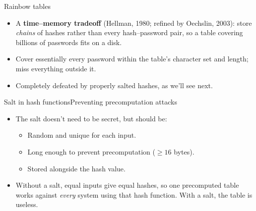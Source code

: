 \ifdefined\PRESENTATION\else\PassOptionsToClass{handout}{beamer}\fi\documentclass[aspectratio=169, lualatex]{beamer}
\begin{document}
\begin{frame}{Rainbow tables}
	\begin{itemize}
		\item A \textbf{time--memory tradeoff} (Hellman, 1980; refined by Oechslin, 2003): store \emph{chains} of hashes rather than every hash--password pair, so a table covering billions of passwords fits on a disk.
		\item Cover essentially every password within the table's character set and length; miss everything outside it.
		\item Completely defeated by properly salted hashes, as we'll see next.
	\end{itemize}
\end{frame}

\begin{frame}{Salt in hash functions}{Preventing precomputation attacks}
	\begin{itemize}
		\item The salt doesn't need to be secret, but should be:
		      \begin{itemize}
			      \item Random and unique for each input.
			      \item Long enough to prevent precomputation ($\geq 16$ bytes).
			      \item Stored alongside the hash value.
		      \end{itemize}
		\item Without a salt, equal inputs give equal hashes, so one precomputed table works against \emph{every} system using that hash function. With a salt, the table is useless.
	\end{itemize}
\end{frame}
\end{document}
